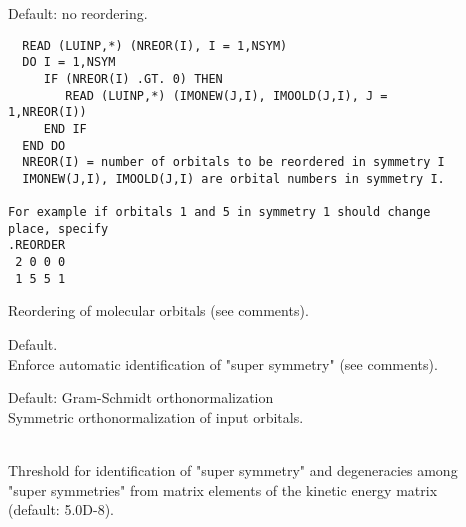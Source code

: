 \begin{description}
\item[]
Default: no reordering.
\begin{verbatim}
  READ (LUINP,*) (NREOR(I), I = 1,NSYM)
  DO I = 1,NSYM
     IF (NREOR(I) .GT. 0) THEN
        READ (LUINP,*) (IMONEW(J,I), IMOOLD(J,I), J = 1,NREOR(I))
     END IF
  END DO
  NREOR(I) = number of orbitals to be reordered in symmetry I
  IMONEW(J,I), IMOOLD(J,I) are orbital numbers in symmetry I.

For example if orbitals 1 and 5 in symmetry 1 should change place, specify
.REORDER
 2 0 0 0
 1 5 5 1
\end{verbatim}
  Reordering of molecular orbitals (see comments).

\item[]
  Default.\\
  Enforce automatic identification of "super
  symmetry" (see comments).

\item[]
  Default: Gram-Schmidt orthonormalization\\
  Symmetric orthonormalization of input
  orbitals.

\item[]
   \\
  Threshold for identification of "super
  symmetry" and degeneracies among
  "super symmetries" from matrix elements of the kinetic energy matrix
  (default: 5.0D-8).

\end{description}



